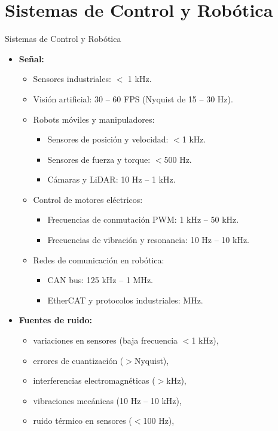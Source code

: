 \documentclass{beamer}
\numberwithin{section}{part}
\begin{document}
\section{Sistemas de Control y Robótica}
\begin{frame}{Sistemas de Control y Robótica}
    \begin{itemize}
        \item \textbf{Señal:}
        \begin{itemize}
            \item Sensores industriales: $<$ 1 kHz.
            \item Visión artificial: 30 – 60 FPS (Nyquist de 15 – 30 Hz).
            \item Robots móviles y manipuladores:
            \begin{itemize}
                \item Sensores de posición y velocidad: $<$1 kHz.
                \item Sensores de fuerza y torque: $<$500 Hz.
                \item Cámaras y LiDAR: 10 Hz – 1 kHz.
            \end{itemize}
            \item Control de motores eléctricos:
            \begin{itemize}
                \item Frecuencias de conmutación PWM: 1 kHz – 50 kHz.
                \item Frecuencias de vibración y resonancia: 10 Hz – 10 kHz.
            \end{itemize}
            \item Redes de comunicación en robótica:
            \begin{itemize}
                \item CAN bus: 125 kHz – 1 MHz.
                \item EtherCAT y protocolos industriales: MHz.
            \end{itemize}
        \end{itemize}
        \item \textbf{Fuentes de ruido:}
        \begin{itemize}
            \item variaciones en sensores (baja frecuencia $<$1 kHz),
            \item errores de cuantización ($>$Nyquist),
            \item interferencias electromagnéticas ($>$kHz),
            \item vibraciones mecánicas (10 Hz – 10 kHz),
            \item ruido térmico en sensores ($<$100 Hz),
        \end{itemize}
    \end{itemize}
\end{frame}
\end{document}
